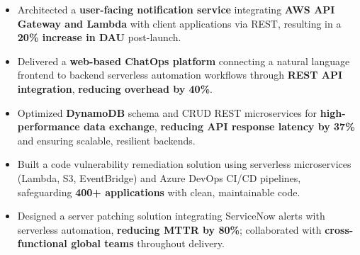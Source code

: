 \documentclass[letterpaper,10.5pt]{extarticle}
\begin{document}
\begin{itemize}[leftmargin=12pt, topsep=1pt, itemsep=0pt, parsep=0pt]
    \item Architected a \textbf{user-facing notification service} integrating \textbf{AWS API Gateway and Lambda} with client applications via REST, resulting in a \textbf{20\% increase in DAU} post-launch.
    \item Delivered a \textbf{web-based ChatOps platform} connecting a natural language frontend to backend serverless automation workflows through \textbf{REST API integration}, \textbf{reducing overhead by 40\%}.
    \item Optimized \textbf{DynamoDB} schema and CRUD REST microservices for \textbf{high-performance data exchange}, \textbf{reducing API response latency by 37\%} and ensuring scalable, resilient backends.
    \item Built a code vulnerability remediation solution using serverless microservices (Lambda, S3, EventBridge) and Azure DevOps CI/CD pipelines, safeguarding \textbf{400+ applications} with clean, maintainable code.
    \item Designed a server patching solution integrating ServiceNow alerts with serverless automation, \textbf{reducing MTTR by 80\%}; collaborated with \textbf{cross-functional global teams} throughout delivery.
\end{itemize}
\end{document}
